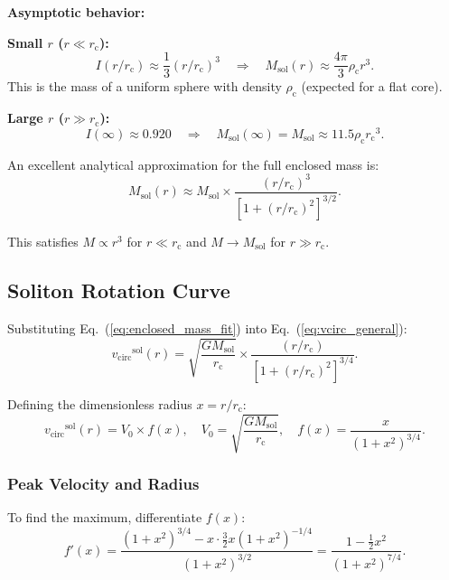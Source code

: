 \documentclass[11pt,a4paper]{article}
\newcommand{\Msol}{\ensuremath{M_{\mathrm{sol}}}}
\newcommand{\rc}{\ensuremath{r_{\mathrm{c}}}}
\newcommand{\rhoc}{\ensuremath{\rho_{\mathrm{c}}}}
\newcommand{\vcirc}{\ensuremath{v_{\mathrm{circ}}}}
\theoremstyle{definition}
\theoremstyle{remark}
\begin{document}
\textbf{Asymptotic behavior:}

\textbf{Small $r$ ($r \ll \rc$):}
\begin{equation}
I(r/\rc) \approx \frac{1}{3}(r/\rc)^3 \quad \Rightarrow \quad M_{\mathrm{sol}}(r) \approx \frac{4\pi}{3}\rhoc r^3.
\end{equation}
This is the mass of a uniform sphere with density $\rhoc$ (expected for a flat core).

\textbf{Large $r$ ($r \gg \rc$):}
\begin{equation}
I(\infty) \approx 0.920 \quad \Rightarrow \quad M_{\mathrm{sol}}(\infty) = \Msol \approx 11.5 \rhoc \rc^3.
\end{equation}

An excellent analytical approximation for the full enclosed mass is:
\begin{equation}
\label{eq:enclosed_mass_fit}
\boxed{M_{\mathrm{sol}}(r) \approx \Msol \times \frac{(r/\rc)^3}{[1 + (r/\rc)^2]^{3/2}}.}
\end{equation}

This satisfies $M \propto r^3$ for $r \ll \rc$ and $M \to \Msol$ for $r \gg \rc$.

\subsection{Soliton Rotation Curve}
\label{sec:soliton_rotation}

Substituting Eq.~(\ref{eq:enclosed_mass_fit}) into Eq.~(\ref{eq:vcirc_general}):
\begin{equation}
\label{eq:vcirc_soliton}
\vcirc^{\mathrm{sol}}(r) = \sqrt{\frac{G \Msol}{\rc}} \times \frac{(r/\rc)}{[1 + (r/\rc)^2]^{3/4}}.
\end{equation}

Defining the dimensionless radius $x = r/\rc$:
\begin{equation}
\vcirc^{\mathrm{sol}}(r) = V_0 \times f(x), \quad V_0 = \sqrt{\frac{G\Msol}{\rc}}, \quad f(x) = \frac{x}{(1 + x^2)^{3/4}}.
\end{equation}

\subsubsection{Peak Velocity and Radius}

To find the maximum, differentiate $f(x)$:
\begin{equation}
f'(x) = \frac{(1+x^2)^{3/4} - x \cdot \frac{3}{2}x(1+x^2)^{-1/4}}{(1+x^2)^{3/2}} = \frac{1 - \frac{1}{2}x^2}{(1+x^2)^{7/4}}.
\end{equation}
\end{document}
